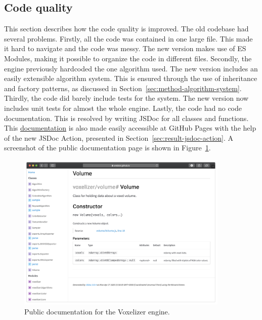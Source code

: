 \subsection{Code quality}
This section describes how the code quality is improved. The old codebase had several problems. Firstly, all the code was contained in one large file. This made it hard to navigate and the code was messy. The new version makes use of ES Modules, making it possible to organize the code in different files. Secondly, the engine previously hardcoded the one algorithm used. The new version includes an easily extensible algorithm system. This is ensured through the use of inheritance and factory patterns, as discussed in Section~\ref{sec:method-algorithm-system}. Thirdly, the code did barely include tests for the system. The new version now includes unit tests for almost the whole engine. Lastly, the code had no code documentation. This is resolved by writing JSDoc for all classes and functions. This \href{https://andstor.github.io/voxelizer/}{documentation} is also made easily accessible at GitHub Pages with the help of the new JSDoc Action, presented in Section~\ref{sec:result-jsdoc-action}. A screenshot of the public documentation page is shown in Figure~\ref{fig:result-voxelizer-documentation}.
\begin{figure}[htp]
    \centering
    \includegraphics[width=0.9\textwidth]{sections/result/figures/voxelizer-documentation.png}
    \caption{Public documentation for the Voxelizer engine.}
    \label{fig:result-voxelizer-documentation}
\end{figure}

